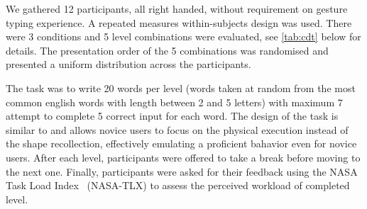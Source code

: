 \documentclass{chi-ext}
\begin{document}

We gathered 12 participants, all right handed, without requirement on gesture typing experience. A repeated measures within-subjects design was used. There were 3 conditions and 5 level combinations were evaluated, see \autoref{tab:cdt} below for details. The presentation order of the 5 combinations was randomised and presented a uniform distribution across the participants.

The task was to write 20 words per level (words taken at random from the most common english words with length between 2 and 5 letters) with maximum 7 attempt to complete 5 correct input for each word. The design of the task is similar to \cite{Quinn2016} and allows novice users to focus on the physical execution instead of the shape recollection, effectively emulating a proficient bahavior even for novice users. After each level, participants were offered to take a break before moving to the next one. Finally, participants were asked for their feedback using the NASA Task Load Index~\cite{Hart1988} (NASA-TLX) to assess the perceived workload of completed level.
\end{document}
